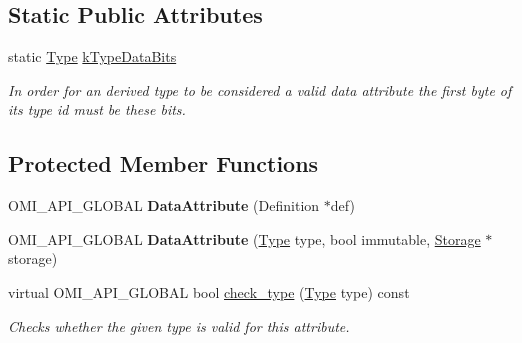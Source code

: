 \subsection*{Static Public Attributes}
\begin{DoxyCompactItemize}
\item 
static \hyperlink{classomi_1_1_attribute_aae4992bc8d2b12679548909bc813eecf}{Type} \hyperlink{classomi_1_1_data_attribute_a643c810debd5ed15523b30b3303f2e07}{k\+Type\+Data\+Bits}\hypertarget{classomi_1_1_data_attribute_a643c810debd5ed15523b30b3303f2e07}{}\label{classomi_1_1_data_attribute_a643c810debd5ed15523b30b3303f2e07}

\begin{DoxyCompactList}\small\item\em In order for an derived type to be considered a valid data attribute the first byte of its type id must be these bits. \end{DoxyCompactList}\end{DoxyCompactItemize}
\subsection*{Protected Member Functions}
\begin{DoxyCompactItemize}
\item 
O\+M\+I\+\_\+\+A\+P\+I\+\_\+\+G\+L\+O\+B\+AL {\bfseries Data\+Attribute} (Definition $\ast$def)\hypertarget{classomi_1_1_data_attribute_acf884a6eab45f04b0cf56a6817bbdbec}{}\label{classomi_1_1_data_attribute_acf884a6eab45f04b0cf56a6817bbdbec}

\item 
O\+M\+I\+\_\+\+A\+P\+I\+\_\+\+G\+L\+O\+B\+AL {\bfseries Data\+Attribute} (\hyperlink{classomi_1_1_attribute_aae4992bc8d2b12679548909bc813eecf}{Type} type, bool immutable, \hyperlink{classomi_1_1_attribute_1_1_storage}{Storage} $\ast$storage)\hypertarget{classomi_1_1_data_attribute_a4f223420e2bf8d2cb80750564e85a27e}{}\label{classomi_1_1_data_attribute_a4f223420e2bf8d2cb80750564e85a27e}

\item 
virtual O\+M\+I\+\_\+\+A\+P\+I\+\_\+\+G\+L\+O\+B\+AL bool \hyperlink{classomi_1_1_data_attribute_a7138ea4cb0415b3da4bdfa813d53fd83}{check\+\_\+type} (\hyperlink{classomi_1_1_attribute_aae4992bc8d2b12679548909bc813eecf}{Type} type) const \hypertarget{classomi_1_1_data_attribute_a7138ea4cb0415b3da4bdfa813d53fd83}{}\label{classomi_1_1_data_attribute_a7138ea4cb0415b3da4bdfa813d53fd83}

\begin{DoxyCompactList}\small\item\em Checks whether the given type is valid for this attribute. \end{DoxyCompactList}\end{DoxyCompactItemize}
